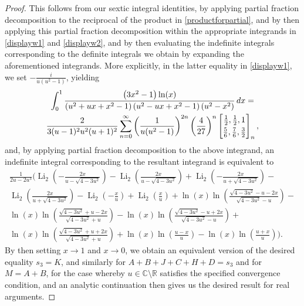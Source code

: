 \documentclass[12pt]{article}
\begin{document}
\begin{proof}
 This follows from our sextic integral identities, by applying partial fraction decomposition to the reciprocal of the product in 
 \eqref{productforpartial}, and by then applying this partial fraction decomposition within the appropriate integrands in 
 \eqref{displayw1} and \eqref{displayw2}, and by then evaluating the indefinite integrals corresponding to the definite integrals we 
 obtain by expanding the aforementioned integrands. More explicitly, in the latter equality in 
 \eqref{displayw1}, we set $-\frac{i}{u \left(u^2-1\right)}$, yielding 
\begin{multline*}
 \int_{0}^{1} \frac{\left(3 x^2 - 
 1\right) \ln (x)}{\left(u^2+u x+x^2-1\right) \left(u^2-u x+x^2-1\right) \left(u^2-x^2\right)} \, dx = \\ 
 \frac{2}{3 (u-1)^2 u^2 (u+1)^2} \sum_{n=0}^{\infty} 
 \left( \frac{1}{u(u^2-1)} \right)^{2n} \left( \frac{4}{27} \right)^{n} 
 \left[ \begin{matrix} \frac{1}{2}, \frac{1}{2}, 1 
 \vspace{1mm} \\ 
 \frac{5}{6}, \frac{7}{6}, \frac{3}{2} \end{matrix} \right]_{n}, 
\end{multline*}
 and, by applying partial fraction decomposition 
 to the above integrand, an indefinite integral 
 corresponding to the resultant integrand is equivalent to 
\begin{multline*}
 \frac{1}{2 u-2 u^3} \Bigg( \operatorname{Li}_2\left(-\frac{2 x}{u-\sqrt{4-3 u^2}}\right) - 
 \operatorname{Li}_2\left(\frac{2 x}{u-\sqrt{4-3 u^2}}\right)+\operatorname{Li}_2\left(-\frac{2
 x}{u+\sqrt{4-3 u^2}}\right) - \\ 
 \operatorname{Li}_2\left(\frac{2 x}{u+\sqrt{4-3
 u^2}}\right)-\operatorname{Li}_2\left(-\frac{x}{u}\right)+\operatorname{Li}_2\left(\frac{x}{u}\right) + \ln (x) \ln \left(\frac{\sqrt{4-3 u^2}-u-2
 x}{\sqrt{4-3 u^2}-u}\right) - \\ 
 \ln (x) \ln \left(\frac{\sqrt{4-3 u^2}+u-2 x}{\sqrt{4-3 u^2}+u}\right)-\ln (x) \ln \left(\frac{\sqrt{4-3
 u^2}-u+2 x}{\sqrt{4-3 u^2}-u}\right) + \\ 
 \ln (x) \ln \left(\frac{\sqrt{4-3 u^2}+u+2 x}{\sqrt{4-3 u^2}+u}\right)+\ln (x) \ln
 \left(\frac{u-x}{u}\right)-\ln (x) \ln \left(\frac{u+x}{u}\right) \Bigg). 
\end{multline*}
 By then setting $x \to 1$ and $x \to 0$, we obtain an equivalent version of the desired equality $s_3 = K$, 
 and similarly for 
 $ A + B + J + C + H + D = s_3$ and for $ M = A + B$, for the case whereby
 $u \in \mathbb{C} \setminus \mathbb{R}$ satisfies the specified convergence condition, 
 and an analytic continuation then gives us the desired result for real arguments. 
\end{proof}
\end{document}
